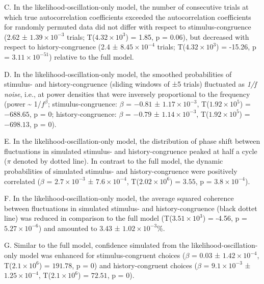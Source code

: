 \documentclass[
]{article}
\begin{document}
C. In the likelihood-oscillation-only model, the number of consecutive
trials at which true autocorrelation coefficients exceeded the
autocorrelation coefficients for randomly permuted data did not differ
with respect to stimulus-congruence (2.62 ±
\ensuremath{1.39\times 10^{-3}} trials;
T(\ensuremath{4.32\times 10^{3}}) = 1.85, p = \(0.06\)), but decreased
with respect to history-congruence (2.4 ±
\ensuremath{8.45\times 10^{-4}} trials;
T(\ensuremath{4.32\times 10^{3}}) = -15.26, p =
\(\ensuremath{3.11\times 10^{-51}}\)) relative to the full model.

D. In the likelihood-oscillation-only model, the smoothed probabilities
of stimulus- and history-congruence (sliding windows of ±5 trials)
fluctuated as \emph{1/f noise}, i.e., at power densities that were
inversely proportional to the frequency (power \textasciitilde{}
1/\(f^\beta\); stimulus-congruence: \(\beta\) = \(-0.81\) ±
\(\ensuremath{1.17\times 10^{-3}}\),
T(\(\ensuremath{1.92\times 10^{5}}\)) = \(-688.65\), p = \(0\);
history-congruence: \(\beta\) = \(-0.79\) ±
\(\ensuremath{1.14\times 10^{-3}}\),
T(\(\ensuremath{1.92\times 10^{5}}\)) = \(-698.13\), p = \(0\)).

E. In the likelihood-oscillation-only model, the distribution of phase
shift between fluctuations in simulated stimulus- and history-congruence
peaked at half a cycle (\(\pi\) denoted by dotted line). In contrast to
the full model, the dynamic probabilities of simulated stimulus- and
history-congruence were positively correlated (\(\beta\) =
\(\ensuremath{2.7\times 10^{-3}}\) ± \(\ensuremath{7.6\times 10^{-4}}\),
T(\(\ensuremath{2.02\times 10^{6}}\)) = \(3.55\), p =
\(\ensuremath{3.8\times 10^{-4}}\)).

F. In the likelihood-oscillation-only model, the average squared
coherence between fluctuations in simulated stimulus- and
history-congruence (black dottet line) was reduced in comparison to the
full model (T(\ensuremath{3.51\times 10^{3}}) = -4.56, p =
\(\ensuremath{5.27\times 10^{-6}}\)) and amounted to 3.43 ±
\ensuremath{1.02\times 10^{-3}}\%.

G. Similar to the full model, confidence simulated from the
likelihood-oscillation-only model was enhanced for stimulus-congruent
choices (\(\beta\) = \(0.03\) ± \(\ensuremath{1.42\times 10^{-4}}\),
T(\(\ensuremath{2.1\times 10^{6}}\)) = \(191.78\), p = \(0\)) and
history-congruent choices (\(\beta\) =
\(\ensuremath{9.1\times 10^{-3}}\) ±
\(\ensuremath{1.25\times 10^{-4}}\),
T(\(\ensuremath{2.1\times 10^{6}}\)) = \(72.51\), p = \(0\)).
\end{document}
